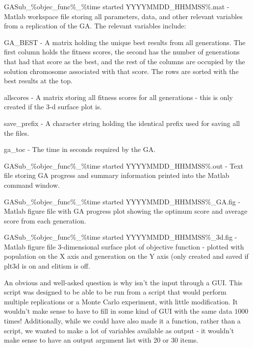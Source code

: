 \documentclass{book}
\newcommand{\textcode}[1]{\textsf{\small #1}}   %
\begin{document}
\begin{compactitem}
\item GASub\_\%objec\_func\%\_\%time started YYYYMMDD\_HHMMSS\%.mat -
Matlab workspace file storing all parameters, data, and other relevant variables from a replication of
the GA. The relevant variables include:
\begin{compactitem}
\item \textcode{GA\_BEST} - A matrix holding the unique best results from
all generations. The first column holds the fitness scores,
the second has the number of generations that had that
score as the best, and the rest of the columns are occupied
by the solution chromosome associated with that score. The
rows are sorted with the best results at the top.

\item \textcode{allscores} - A matrix storing all fitness scores for all
generations - this is only created if the 3-d surface plot
is.

\item \textcode{save\_prefix} - A character string holding the identical
prefix used for saving all the files.

\item \textcode{ga\_toc} - The time in seconds required by the
GA.
\end{compactitem}


\item GASub\_\%objec\_func\%\_\%time started YYYYMMDD\_HHMMSS\%.out - Text
file storing GA progress and summary information printed into
the Matlab command window.

\item GASub\_\%objec\_func\%\_\%time started YYYYMMDD\_HHMMSS\%\_GA.fig -
Matlab figure file with GA progress plot showing the optimum
score and average score from each generation.

\item GASub\_\%objec\_func\%\_\%time started YYYYMMDD\_HHMMSS\%\_3d.fig -
Matlab figure file 3-dimensional surface plot of objective
function - plotted with population on the X axis and generation
on the Y axis (only created and saved if \textcode{plt3d} is on
and \textcode{elitism} is off.
\end{compactitem}

An obvious and well-asked question is why isn't the input through a GUI.
This script was designed to be able to be run from a script that would
perform multiple replications or a Monte Carlo experiment, with little
modification. It wouldn't make sense to have to fill in some kind of GUI
with the same data $1000$ times! Additionally, while we could have also made
it a function, rather than a script, we wanted to make a lot of variables
available as output - it wouldn't make sense to have an output argument list
with 20 or 30 items.
\end{document}
